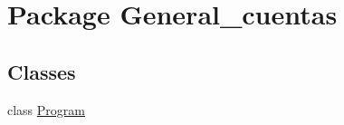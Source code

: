 \hypertarget{namespace_general__cuentas}{\section{Package General\-\_\-cuentas}
\label{namespace_general__cuentas}
}
\subsection*{Classes}
\begin{DoxyCompactItemize}
\item 
class \hyperlink{class_general__cuentas_1_1_program}{Program}
\end{DoxyCompactItemize}
